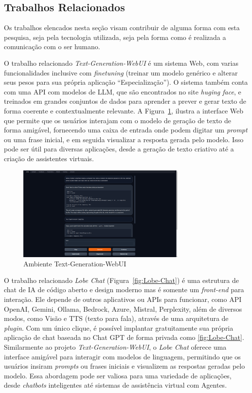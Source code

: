 \documentclass[10pt, conference, compsocconf]{IEEEtran}
\begin{document}
\subsection{Trabalhos Relacionados}
Os trabalhos elencados nesta seção visam contribuir de alguma forma com esta pesquisa, seja pela tecnologia utilizada, seja pela forma como é realizada a comunicação com o ser humano.

O trabalho relacionado \textit{Text-Generation-WebUI} \cite{text-generation-webui} é um sistema Web, com varias funcionalidades inclusive com \textit{finetuning} (treinar um modelo genérico e alterar seus pesos para sua própria aplicação ``Especialização''). O sistema também conta com uma API com modelos de LLM, que são encontrados no site \textit{huging face}, e treinados em grandes conjuntos de dados para aprender a prever e gerar texto de forma coerente e contextualmente relevante. A Figura~\ref{fig:webui}, ilustra a interface Web que permite que os usuários interajam com o modelo de geração de texto de forma amigável, fornecendo uma caixa de entrada onde podem digitar um \textit{prompt} ou uma frase inicial, e em seguida visualizar a resposta gerada pelo modelo. Isso pode ser útil para diversas aplicações, desde a geração de texto criativo até a criação de assistentes virtuais.

\FloatBarrier

\begin{figure}[!h]
\centering
\includegraphics[width=3.3in]{images/Text generation web UI.png}
\caption{Ambiente Text-Generation-WebUI \cite{text-generation-webui}} 
\label{fig:webui}
\end{figure}

\FloatBarrier

O trabalho relacionado \textit{Lobe Chat} (Figura~\ref{fig:Lobe-Chat}) \cite{Lobe-Chat} é uma estrutura de chat de IA de código aberto e design moderno mas é somente um \textit{front-end} para interação. Ele depende de outros aplicativos ou APIs para funcionar, como API OpenAI, Gemini, Ollama, Bedrock, Azure, Mistral, Perplexity, além de diversos modos, como Visão e TTS (texto para fala), através de uma arquitetura de \textit{plugin}. Com um único clique, é possível implantar gratuitamente sua própria aplicação de chat baseada no Chat GPT de forma privada como \ref{fig:Lobe-Chat}. Similarmente ao projeto \textit{Text-Generation-WebUI}, o \textit{Lobe Chat} oferece uma interface amigável para interagir com modelos de linguagem, permitindo que os usuários insiram \textit{prompts} ou frases iniciais e visualizem as respostas geradas pelo modelo. Essa abordagem pode ser valiosa para uma variedade de aplicações, desde \textit{chatbots} inteligentes até sistemas de assistência virtual com Agentes.
\end{document}
